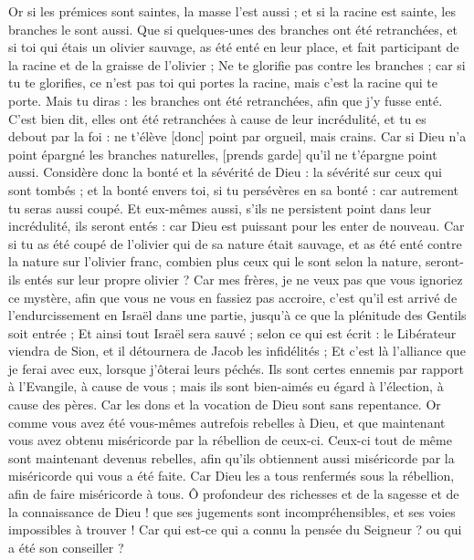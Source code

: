 \begin{multicols}{2}
Or si les prémices sont saintes, la masse l'est aussi ; et si la racine est sainte, les branches le sont aussi.
Que si quelques-unes des branches ont été retranchées, et si toi qui étais un olivier sauvage, as été enté en leur place, et fait participant de la racine et de la graisse de l'olivier ;
Ne te glorifie pas contre les branches ; car si tu te glorifies, ce n'est pas toi qui portes la racine, mais c'est la racine qui te porte.
Mais tu diras : les branches ont été retranchées, afin que j'y fusse enté.
C'est bien dit, elles ont été retranchées à cause de leur incrédulité, et tu es debout par la foi : ne t'élève [donc] point par orgueil, mais crains.
Car si Dieu n'a point épargné les branches naturelles, [prends garde] qu'il ne t'épargne point aussi.
Considère donc la bonté et la sévérité de Dieu : la sévérité sur ceux qui sont tombés ; et la bonté envers toi, si tu persévères en sa bonté : car autrement tu seras aussi coupé.
Et eux-mêmes aussi, s'ils ne persistent point dans leur incrédulité, ils seront entés : car Dieu est puissant pour les enter de nouveau.
Car si tu as été coupé de l'olivier qui de sa nature était sauvage, et as été enté contre la nature sur l'olivier franc, combien plus ceux qui le sont selon la nature, seront-ils entés sur leur propre olivier ?
Car mes frères, je ne veux pas que vous ignoriez ce mystère, afin que vous ne vous en fassiez pas accroire, c'est qu'il est arrivé de l'endurcissement en Israël dans une partie, jusqu'à ce que la plénitude des Gentils soit entrée ;
Et ainsi tout Israël sera sauvé ; selon ce qui est écrit : le Libérateur viendra de Sion, et il détournera de Jacob les infidélités ;
Et c'est là l'alliance que je ferai avec eux, lorsque j'ôterai leurs péchés.
Ils sont certes ennemis par rapport à l'Evangile, à cause de vous ; mais ils sont bien-aimés eu égard à l'élection, à cause des pères.
Car les dons et la vocation de Dieu sont sans repentance.
Or comme vous avez été vous-mêmes autrefois rebelles à Dieu, et que maintenant vous avez obtenu miséricorde par la rébellion de ceux-ci.
Ceux-ci tout de même sont maintenant devenus rebelles, afin qu'ils obtiennent aussi miséricorde par la miséricorde qui vous a été faite.
Car Dieu les a tous renfermés sous la rébellion, afin de faire miséricorde à tous.
Ô profondeur des richesses et de la sagesse et de la connaissance de Dieu ! que ses jugements sont incompréhensibles, et ses voies impossibles à trouver !
Car qui est-ce qui a connu la pensée du Seigneur ? ou qui a été son conseiller ?

\end{multicols}
